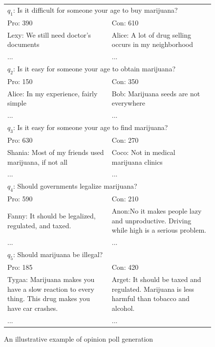 \documentclass{llncs}
\begin{document}
\begin{figure}[htbp]
\begin{center}
\begin{tabular}{|p{6cm}|p{6cm}|}
\hline
\multicolumn{2}{|l|}{$q_1$: Is it difficult for someone your age to buy marijuana?}\\
Pro: 390 & Con: 610 \\
Lexy: We still need doctor's documents& 
         Alice: A lot of drug selling occurs in my neighborhood\\
          ...& ...\\\hline
\multicolumn{2}{|l|}{$q_2$: Is it easy for someone your age to obtain marijuana?}\\
Pro: 150 & Con: 350 \\
Alice: In my experience, fairly simple & 
        Bob: Marijuana seeds are not everywhere\\
          ...& ...\\\hline
\multicolumn{2}{|l|}{$q_3$:  Is it easy for someone your age to find marijuana?}\\
Pro: 630 & Con: 270 \\
 Shania: Most of my friends used marijuana, if not all & 
        Coco: Not in medical marijuana clinics \\
          ...& ...\\\hline
\multicolumn{2}{|l|}{$q_4$: Should governments legalize marijuana?}\\
Pro: 590 & Con: 210 \\
Fanny: It should be legalized, regulated, and taxed. &
Anon:No it makes people lazy and unproductive. Driving while high is a serious problem.\\
...& ...\\\hline

\multicolumn{2}{|l|}{$q_5$: Should marijuana be illegal?}\\
Pro: 185 & Con: 420 \\
Tygaa: Marijuana makes you have a slow reaction to every thing. This drug makes you have car crashes.&
Arget: It should be taxed and regulated. Marijuana is less harmful than tobacco and alcohol.\\
...& ...\\\hline

  \end{tabular}
\caption{An illustrative example of opinion poll generation}
\label{fig:example}
\end{center}
\end{figure}
\end{document}
